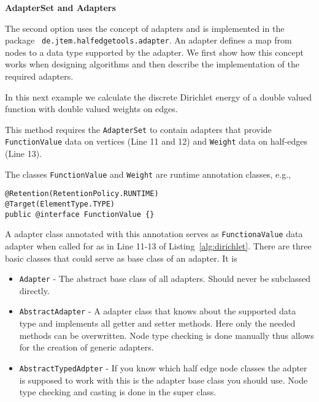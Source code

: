 {\bf AdapterSet and Adapters}

The second option uses the concept of adapters and is implemented in the package {\tt
de.jtem.\-halfedge\-tools.adapter}. An adapter defines a map from nodes to a data type supported 
by the adapter. We first show how this concept works when designing algorithms and then
describe the implementation of the required adapters. 

In this next example we calculate the discrete Dirichlet energy of a double valued function with 
double valued weights on edges. 



This method requires the {\tt AdapterSet} to contain adapters that provide
{\tt FunctionValue} data on vertices (Line 11 and 12) and {\tt Weight} data on half-edges (Line 13). 

The classes {\tt FunctionValue} and {\tt Weight} are runtime annotation classes, e.g.,

\begin{lstlisting}
@Retention(RetentionPolicy.RUNTIME)
@Target(ElementType.TYPE)
public @interface FunctionValue {}
\end{lstlisting}

A adapter class annotated with this annotation serves as {\tt FunctionaValue} data adapter when 
called for as in Line 11-13 of Listing~\ref{alg:dirichlet}.
There are three basic classes that could serve as base class of an adapter. It is

\begin{itemize}
\item {\tt Adapter} - The abstract base class of all adapters. Should never be subclassed directly.
\item {\tt AbstractAdapter} - A adapter class that knows about the supported data type and implements
all getter and setter methods. Here only the needed methods can be overwritten. Node type checking
is done manually thus allows for the creation of generic adapters.
\item {\tt AbstractTypedAdpter} - If you know which half edge node classes the adpter is supposed to
work with this is the adapter base class you should use. Node type checking and casting is done in the
super class.
\end{itemize}

